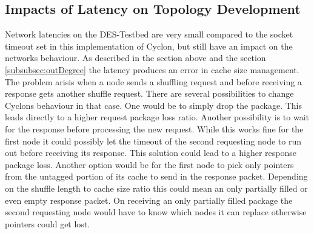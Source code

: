 \subsection{Impacts of Latency on Topology Development}
	Network latencies on the DES-Testbed are very small compared to the socket
	timeout set in this implementation of Cyclon, but still have an impact on the
	networks behaviour. As described in the section above and the section
	\ref{subsubsec:outDegree} the latency produces an error in cache size
	management. The problem arisis when a node sends a shuffling request and before
	receiving a response gets another shuffle request. There are several
	possibilities to change Cyclons behaviour in that case. One would be to simply drop
	the package. This leads directly to a higher request package loss ratio.
	Another possibility is to wait for the response before processing the new
	request. While this works fine for the first node it could possibly let the
	timeout of the second requesting node to run out before receiving its response. This
	solution could lead to a higher response package loss. Another option would be
	for the first node to pick only pointers from the untagged portion of its cache
	to send in the response packet. Depending on the shuffle length to cache size
	ratio this could mean an only partially filled or even empty response packet.
	On receiving an only partially filled package the second requesting node would
	have to know which nodes it can replace otherwise pointers could get lost.
	
	
	
	
	
	
	
	